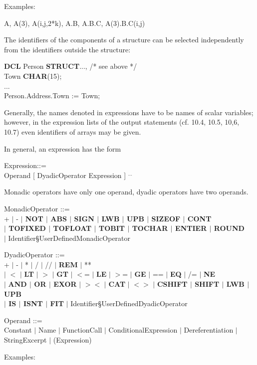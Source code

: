 Examples:

A, A(3), A(i,j,2*k), A.B, A.B.C, A(3).B.C(i,j)

The identifiers of the components of a structure can be selected
independently from the identifiers outside the structure:

{\bf DCL} Person {\bf STRUCT}..., /* see above */ \\
\x Town {\bf CHAR}(15);\\
\x ...\\
Person.Address.Town := Town;

Generally, the names denoted in expressions have to be names of scalar
variables; however, in the expression lists of the output statements
(cf. 10.4, 10.5, 10,6, 10.7) even identifiers of arrays may be given.

In general, an expression has the form

Expression::=\\
\x [ MonadicOperator ] Operand [ DyadicOperator Expression ] $^{...}$

Monadic operators have only one operand, dyadic operators have two
operands.

MonadicOperator ::=\\
\x + $\mid$ - {\bf $\mid$ NOT $\mid$ ABS $\mid$ SIGN $\mid$ LWB $\mid$ UPB $\mid$ SIZEOF $\mid$ CONT \\
\x $\mid$ TOFIXED $\mid$ TOFLOAT $\mid$ TOBIT $\mid$ TOCHAR $\mid$ ENTIER $\mid$ ROUND} \\
\x $\mid$ Identifier\S UserDefinedMonadicOperator

DyadicOperator ::=\\
\x + $\mid$ - $\mid$ * $\mid$ / $\mid$ // $\mid$ {\bf REM} $\mid$ ** \\
\x $\mid$ $<$ $\mid$ {\bf LT} $\mid$ $>$ $\mid$ {\bf GT} $\mid$ $<$= $\mid$ {\bf LE} $\mid$ $>$= $\mid$ {\bf GE} $\mid$ == $\mid$ {\bf EQ} $\mid$ /= $\mid$ {\bf NE} \\
\x $\mid$ {\bf AND $\mid$ OR $\mid$ EXOR} $\mid$ $><$ $\mid$ {\bf CAT} $\mid$ $<>$ $\mid$ {\bf CSHIFT $\mid$ SHIFT $\mid$ LWB $\mid$ UPB \\
\x $\mid$ IS $\mid$ ISNT $\mid$ FIT} \x $\mid$ Identifier\S UserDefinedDyadicOperator

Operand ::=\\
\x Constant $\mid$ Name $\mid$ FunctionCall $\mid$ ConditionalExpression $\mid$ Dereferentiation $\mid$\\
\x StringExcerpt $\mid$ (Expression)

Examples:

